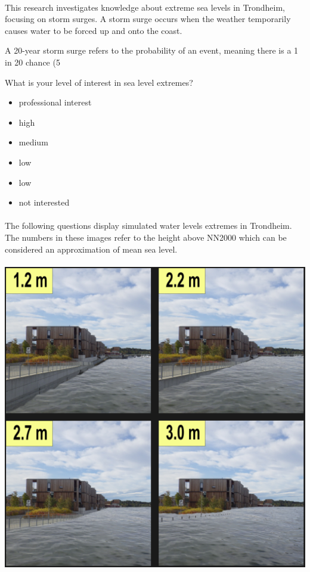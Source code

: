\paragraph{}

This research investigates knowledge about extreme sea levels in Trondheim, focusing on storm surges. A storm surge occurs when the weather temporarily causes water to be forced up and onto the coast.

A 20-year storm surge refers to the probability of an event, meaning there is a 1 in 20 chance (5%

What is your level of interest in sea level extremes?
\begin{itemize}
    \item professional interest
    \item high
    \item medium
    \item low
    \item low
    \item not interested
\end{itemize}
\paragraph{}

The following questions display simulated water levels extremes in Trondheim. The numbers in these images refer to the height above NN2000 which can be considered an approximation of mean sea level.
\paragraph{}
\includegraphics[width=1\textwidth]{fig_appendix/grillstad 2090 q.png}

